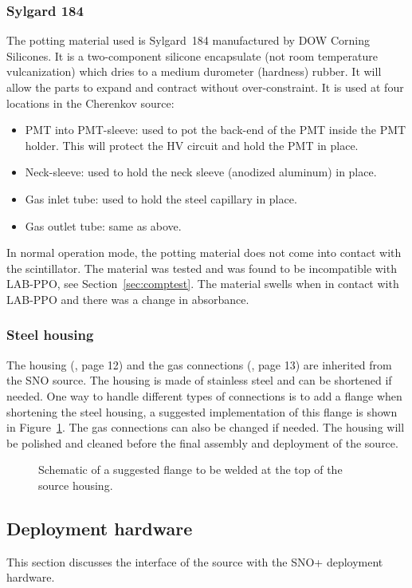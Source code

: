 \subsubsection{Sylgard 184}
\label{sec:sylgard}
The potting material used is Sylgard~184 manufactured by DOW Corning Silicones. It is a two-component silicone encapsulate (not room temperature vulcanization) which dries to a medium durometer (hardness) rubber. It will allow the parts to expand and contract without over-constraint. It is used at four locations in the Cherenkov source:
\begin{itemize}
    \item PMT into PMT-sleeve: used to pot the back-end of the PMT inside the PMT holder. This will protect the HV circuit and hold the PMT in place.
    \item Neck-sleeve: used to hold the neck sleeve (anodized aluminum) in place.
    \item Gas inlet tube: used to hold the steel capillary in place.
    \item Gas outlet tube: same as above.
\end{itemize}
In normal operation mode, the potting material does not come into contact with the scintillator. The material was tested and was found to be incompatible with LAB-PPO, see Section~\ref{sec:comptest}. The material swells when in contact with LAB-PPO and there was a change in absorbance.
\subsubsection{Steel housing}
The housing (\cite{wallig:2015}, page 12) and the gas connections (\cite{wallig:2015}, page 13) are inherited from the SNO \Li source. The housing is made of stainless steel and can be shortened if needed. One way to handle different types of connections is to add a flange when shortening the steel housing, a suggested implementation of this flange is shown in Figure~\ref{fig:flange}. The gas connections can also be changed if needed. The housing will be polished and cleaned before the final assembly and deployment of the source.

\begin{figure}
\caption{\label{fig:flange} Schematic of a suggested flange to be welded at the top of the source housing. }
\end{figure}

\subsection{Deployment hardware}
This section discusses the interface of the source with the SNO+ deployment hardware. 
